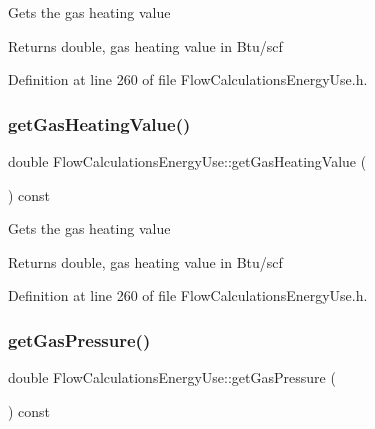 Gets the gas heating value

\begin{DoxyReturn}{Returns}
double, gas heating value in Btu/scf 
\end{DoxyReturn}


Definition at line 260 of file Flow\+Calculations\+Energy\+Use.\+h.

\mbox{\label{class_flow_calculations_energy_use_a42818c3f03cc70967eb6bb24094530a1}} 
\subsubsection{\texorpdfstring{get\+Gas\+Heating\+Value()}{getGasHeatingValue()}\hspace{0.1cm}{\footnotesize\ttfamily [3/3]}}
{\footnotesize\ttfamily double Flow\+Calculations\+Energy\+Use\+::get\+Gas\+Heating\+Value (\begin{DoxyParamCaption}{ }\end{DoxyParamCaption}) const\hspace{0.3cm}{\ttfamily [inline]}}

Gets the gas heating value

\begin{DoxyReturn}{Returns}
double, gas heating value in Btu/scf 
\end{DoxyReturn}


Definition at line 260 of file Flow\+Calculations\+Energy\+Use.\+h.

\mbox{\label{class_flow_calculations_energy_use_af98e97bce88915e6fdd7a0caf837049c}} 
\subsubsection{\texorpdfstring{get\+Gas\+Pressure()}{getGasPressure()}\hspace{0.1cm}{\footnotesize\ttfamily [1/3]}}
{\footnotesize\ttfamily double Flow\+Calculations\+Energy\+Use\+::get\+Gas\+Pressure (\begin{DoxyParamCaption}{ }\end{DoxyParamCaption}) const\hspace{0.3cm}{\ttfamily [inline]}}

